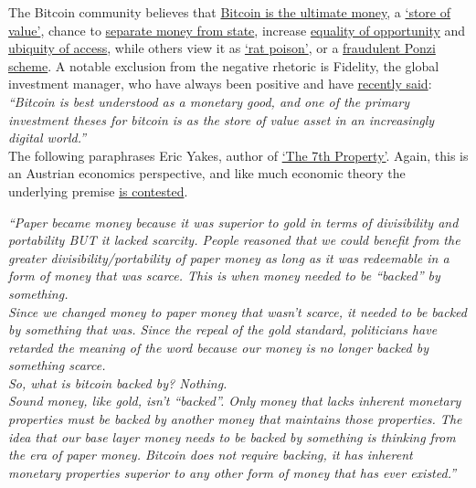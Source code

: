 The Bitcoin community believes that \href{https://svetski.medium.com/why-bitcoin-not-shitcoin-6cc826f4fa52}{Bitcoin is the ultimate money}, a \href{https://www.coindesk.com/business/2022/01/07/jpmorgan-sees-more-crypto-adoption-in-2022-debates-bitcoins-status-as-store-of-value/}{`store of value'}, chance to \href{https://www.forbes.com/sites/leeorshimron/2020/06/30/bitcoin-is-the-separation-of-money-and-state/?sh=49294a8356db}{separate money from state}, increase \href{https://www.washingtonpost.com/national/locked-out-of-traditional-financial-industry-more-people-of-color-are-turning-to-cryptocurrency/2021/12/01/a21df3fa-37fe-11ec-9bc4-86107e7b0ab1_story.html}{equality of opportunity} and \href{https://iai.tv/articles/the-rich-get-richer-the-poor-get-bitcoin-auid-1766}{ubiquity of access}, while others view it as \href{https://www.cnbc.com/2021/06/22/a-third-of-investors-think-bitcoin-is-rat-poison-jpmorgan-survey-says.html}{`rat poison'}, or a \href{https://jacobinmag.com/2022/01/cryptocurrency-scam-blockchain-bitcoin-economy-decentralization}{fraudulent Ponzi scheme}. A notable exclusion from the negative rhetoric is Fidelity, the global investment manager, who have always been positive and have \href{https://www.fidelitydigitalassets.com/articles/bitcoin-first?sf253214177=1}{recently said}: \\
\textit{``Bitcoin is best understood as a monetary good, and one of the primary investment theses for bitcoin is as the store of value asset in an increasingly digital world.''}\\
The following paraphrases Eric Yakes, author of \href{https://yakes.io/book/}{`The 7th Property'}. Again, this is an Austrian economics perspective, and like much economic theory the underlying premise \href{https://medium.datadriveninvestor.com/do-you-understand-the-austrian-vs-keynesian-economic-debate-2f4b152c6a6b}{is contested}\cite{maurel2012keynesian}.\par
\textit{``Paper became money because it was superior to gold in terms of divisibility and portability BUT it lacked scarcity. People reasoned that we could benefit from the greater divisibility/portability of paper money as long as it was redeemable in a form of money that was scarce. This is when money needed to be ``backed'' by something. \\
Since we changed money to paper money that wasn't scarce, it needed to be backed by something that was. Since the repeal of the gold standard, politicians have retarded the meaning of the word because our money is no longer backed by something scarce.\\
So, what is bitcoin backed by? Nothing.\\
Sound money, like gold, isn’t ``backed''.
Only money that lacks inherent monetary properties must be backed by another money that maintains those properties. The idea that our base layer money needs to be backed by something is thinking from the era of paper money. Bitcoin does not require backing, it has inherent monetary properties superior to any other form of money that has ever existed.''}\\

